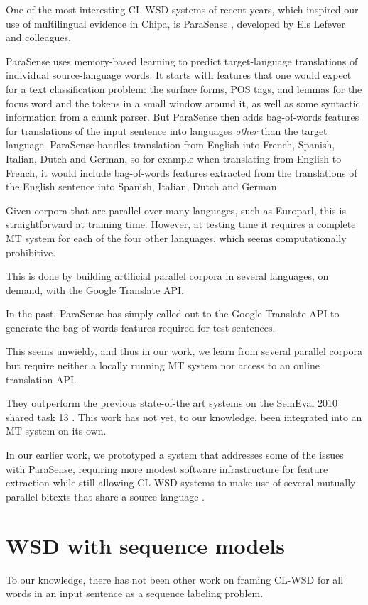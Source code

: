 One of the most interesting CL-WSD systems of recent years, which inspired our
use of multilingual evidence in Chipa, is ParaSense
\cite{lefever-hoste-decock:2011:ACL-HLT2011},
developed by Els Lefever and colleagues.

ParaSense uses memory-based learning to predict target-language translations
of individual source-language words. It starts with features that one would
expect for a text classification problem: the surface forms, POS tags, and
lemmas for the focus word and the tokens in a small window around it, as well
as some syntactic information from a chunk parser. But ParaSense then adds
bag-of-words features for translations of the input sentence into languages
\emph{other} than the target language. ParaSense handles translation from
English into French, Spanish, Italian, Dutch and German, so for example when
translating from English to French, it would include bag-of-words features
extracted from the translations of the English sentence into Spanish, Italian,
Dutch and German.  

Given corpora that are parallel over many languages, such as Europarl, this is
straightforward at training time.
However, at testing time it requires a complete MT system for each of the four
other languages, which seems computationally prohibitive.

This is done by building artificial parallel corpora in several languages, on
demand, with the Google Translate API.


In the past, ParaSense has simply called out to the Google Translate API to
generate the bag-of-words features required for test sentences.

This seems unwieldy, and thus in our work, we learn from several parallel
corpora but require neither a locally running MT system nor access to an online
translation API.

They outperform the previous state-of-the art systems on the SemEval 2010
shared task 13 \cite{lefever-hoste-decock:2011:ACL-HLT2011}.
This work has not yet, to our knowledge, been integrated into an MT system
on its own.


In our earlier work, we prototyped a system that addresses some of the issues
with ParaSense, requiring more modest software infrastructure for feature
extraction while still allowing CL-WSD systems to make use of several mutually
parallel bitexts that share a source language
\cite{rudnick-liu-gasser:2013:SemEval-2013}.


\section{WSD with sequence models}
To our knowledge, there has not been other work on framing CL-WSD for all words
in an input sentence as a sequence labeling problem.


